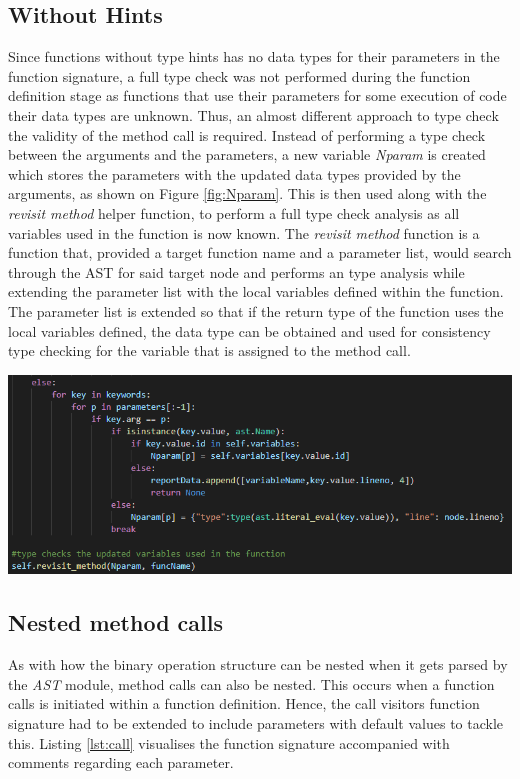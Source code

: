 \documentclass{l4proj}
\begin{document}
\subsection{Without Hints}
Since functions without type hints has no data types for their parameters in the function signature, a full type check was not performed during the function definition stage as functions that use their parameters for some execution of code their data types are unknown. Thus, an almost different approach to type check the validity of the method call is required. Instead of performing a type check between the arguments and the parameters, a new variable \textit{Nparam} is created which stores the parameters with the updated data types provided by the arguments, as shown on Figure \ref{fig:Nparam}. This is then used along with the \textit{revisit \textunderscore method} helper function, to perform a full type check analysis as all variables used in the function is now known. The \textit{revisit \textunderscore method} function is a function that, provided a target function name and a parameter list, would search through the AST for said target node and performs an type analysis while extending the parameter list with the local variables defined within the function. The parameter list is extended so that if the return type of the function uses the local variables defined, the data type can be obtained and used for consistency type checking for the variable that is assigned to the method call.

\begin{center}
    \includegraphics[width=\textwidth]{images/Nparam.png}
    \label{fig:Nparam}
\end{center}

\subsection{Nested method calls}
As with how the binary operation structure can be nested when it gets parsed by the \textit{AST} module, method calls can also be nested. This occurs when a function calls is initiated within a function definition. Hence, the call visitors function signature had to be extended to include parameters with default values to tackle this. Listing \ref{lst:call} visualises the function signature accompanied with comments regarding each parameter.
\end{document}
